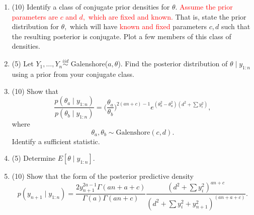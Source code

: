 \documentclass{article}
\begin{document}
\begin{enumerate}
\begin{enumerate}
\item (10) Identify a class of conjugate prior densities for $\theta$. \textcolor{red}{Assume the prior parameters are \textcolor{red}{$c$ and $d,$ which are fixed and known.}} That is, state the prior distribution for $\theta,$ which will have \textcolor{red}{known and fixed} parameters $c, d$ such that the resulting posterior is conjugate. Plot a few members of this class of densities.
\item (5) Let $Y_1, \ldots, Y_n \stackrel{iid}{\sim}$ Galenshore($a, \theta$). Find the posterior distribution of $\theta \mid y_{1:n}$ using a prior from your conjugate class. 
\item (10) Show that $$\frac{p(\theta_a \mid y_{1:n})}{p(\theta_b \mid y_{1:n})} = \bigg( \frac{\theta_a}{\theta_b} \bigg)^{2(an + c) - 1}
e^{(\theta_b^2 - \theta_a^2)(d^2 + \sum y_i^2)},$$ where $$\theta_a, \theta_b \sim \text{Galenshore}(c,d).$$ Identify a sufficient statistic. 
\item (5) Determine $E[\theta \mid y_{1:n}]$.
\item (10) Show that the form of the posterior predictive density $$p(y_{n+1} \mid y_{1:n}) =  \frac{2 y_{n+1}^{2a - 1} \Gamma(an + a + c)}{\Gamma(a)\Gamma(an + c)}
\frac{(d^2 + \sum y_i^2)^{an + c}}{(d^2 + \sum y_i^2 + y_{n+1}^2)^{(an + a + c)}}.$$


\end{enumerate}

\end{enumerate}
\end{document}
